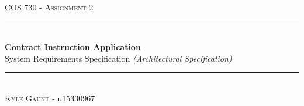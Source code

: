 \documentclass[11pt]{article}
\begin{document}
\begin{titlepage}
	\newcommand{\HRule}{\rule{\linewidth}{0.5mm}}
    \begin{center}
            
    	\textsc{\LARGE COS 730 - Assignment 2}\\[0.8cm]
    
    	\HRule\\[0.4cm]
    	
    	{\huge\bfseries Contract Instruction Application}\\[0.2cm]
    	
    	{\huge System Requirements Specification \textit{(Architectural Specification)}}\\[0.2cm]

    	\HRule\\[0.5cm]

	    \textsc{Kyle Gaunt} - u15330967 \\[0cm]
    
    \end{center}
\end{titlepage}
\tableofcontents
\newpage
\end{document}
